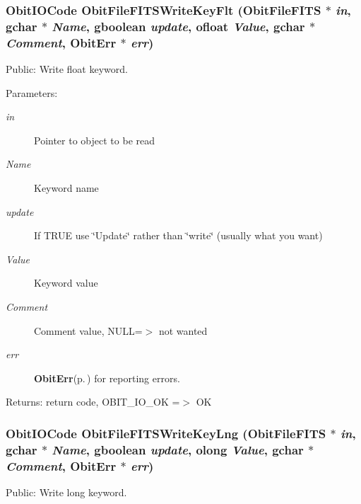\subsubsection{\setlength{\rightskip}{0pt plus 5cm}Obit\-IOCode Obit\-File\-FITSWrite\-Key\-Flt ({\bf Obit\-File\-FITS} $\ast$ {\em in}, gchar $\ast$ {\em Name}, gboolean {\em update}, {\bf ofloat} {\em Value}, gchar $\ast$ {\em Comment}, {\bf Obit\-Err} $\ast$ {\em err})}\label{ObitFileFITS_8c_a23}


Public: Write float keyword. 

\begin{Desc}
\item[Parameters:]
\begin{description}
\item[{\em in}]Pointer to object to be read \item[{\em Name}]Keyword name \item[{\em update}]If TRUE use \char`\"{}Update\char`\"{} rather than \char`\"{}write\char`\"{} (usually what you want) \item[{\em Value}]Keyword value \item[{\em Comment}]Comment value, NULL=$>$ not wanted \item[{\em err}]{\bf Obit\-Err}{\rm (p.\,\pageref{structObitErr})} for reporting errors. \end{description}
\end{Desc}
\begin{Desc}
\item[Returns:]return code, OBIT\_\-IO\_\-OK =$>$ OK \end{Desc}
\subsubsection{\setlength{\rightskip}{0pt plus 5cm}Obit\-IOCode Obit\-File\-FITSWrite\-Key\-Lng ({\bf Obit\-File\-FITS} $\ast$ {\em in}, gchar $\ast$ {\em Name}, gboolean {\em update}, {\bf olong} {\em Value}, gchar $\ast$ {\em Comment}, {\bf Obit\-Err} $\ast$ {\em err})}\label{ObitFileFITS_8c_a25}


Public: Write long keyword. 


